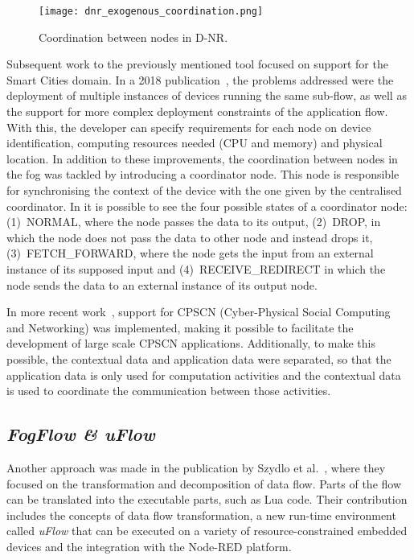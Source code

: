 \begin{figure}[h]
\centering
\texttt{[image: dnr\_exogenous\_coordination.png]}
\caption[Coordination between nodes in D-NR]{Coordination between nodes in D-NR\cite{fog_at_the_edge}.}\label{fig:coordination_dnr}
\end{figure}

Subsequent work to the previously mentioned tool focused on support for the Smart Cities domain. In a 2018 publication~\cite{fog_at_the_edge}, the problems addressed were the deployment of multiple instances of devices running the same sub-flow, as well as the support for more complex deployment constraints of the application flow. With this, the developer can specify requirements for each node on device identification, computing resources needed (CPU and memory) and physical location. In addition to these improvements, the coordination between nodes in the fog was tackled by introducing a coordinator node. This node is responsible for synchronising the context of the device with the one given by the centralised coordinator. In  it is possible to see the four possible states of a coordinator node: (1)~NORMAL, where the node passes the data to its output, (2)~DROP, in which the node does not pass the data to other node and instead drops it, (3)~FETCH\_FORWARD, where the node gets the input from an external instance of its supposed input and (4)~RECEIVE\_REDIRECT in which the node sends the data to an external instance of its output node.

In more recent work~\cite{exogenous_coordination}, support for CPSCN (Cyber-Physical Social Computing and Networking) was implemented, making it possible to facilitate the development of large scale CPSCN applications. Additionally, to make this possible, the contextual data and application data were separated, so that the application data is only used for computation activities and the contextual data is used to coordinate the communication between those activities.

\subsection{\textit{FogFlow \& uFlow}}\label{sec:decentralized_sota_uflow}

Another approach was made in the publication by Szydlo et al.~\cite{flow_based_programming_fog}, where they focused on the transformation and decomposition of data flow. Parts of the flow can be translated into the executable parts, such as Lua code. Their contribution includes the concepts of data flow transformation, a new run-time environment called \textit{uFlow} that can be executed on a variety of resource-constrained embedded devices and the integration with the Node-RED platform. 

